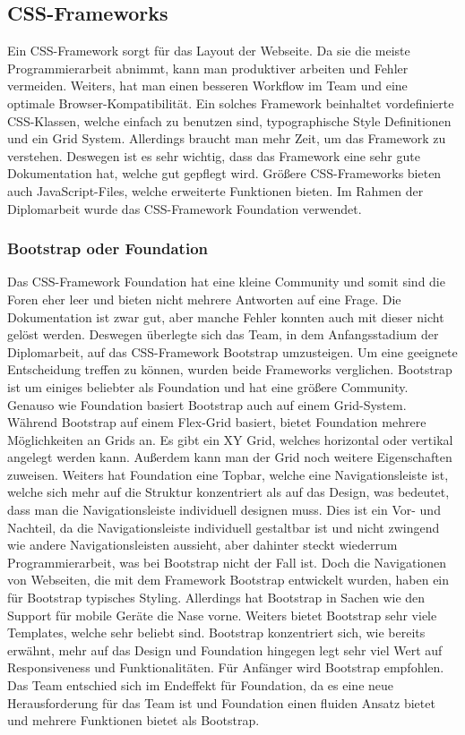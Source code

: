 \subsection{CSS-Frameworks} 
Ein CSS-Framework sorgt für das Layout der Webseite. Da sie die meiste Programmierarbeit abnimmt, kann man produktiver arbeiten und Fehler vermeiden. Weiters, hat man einen besseren Workflow im Team und eine optimale Browser-Kompatibilität. 
Ein solches Framework beinhaltet vordefinierte CSS-Klassen, welche einfach zu benutzen sind, typographische Style Definitionen und ein Grid System.  
Allerdings braucht man mehr Zeit, um das Framework zu verstehen. Deswegen ist es sehr wichtig, dass das Framework eine sehr gute Dokumentation hat, welche gut gepflegt wird. Größere CSS-Frameworks bieten auch JavaScript-Files, welche erweiterte Funktionen bieten. Im Rahmen der Diplomarbeit wurde das CSS-Framework Foundation verwendet.\cite{cssframework}
\subsubsection{Bootstrap oder Foundation}
Das CSS-Framework Foundation hat eine kleine Community und somit sind die Foren eher leer und bieten nicht mehrere Antworten auf eine Frage. Die Dokumentation ist zwar gut, aber manche Fehler konnten auch mit dieser nicht gelöst werden. Deswegen überlegte sich das Team, in dem Anfangsstadium der Diplomarbeit, auf das CSS-Framework Bootstrap umzusteigen. Um eine geeignete Entscheidung treffen zu können, wurden beide Frameworks verglichen. Bootstrap ist um einiges beliebter als Foundation und hat eine größere Community. Genauso wie Foundation basiert Bootstrap auch auf einem Grid-System. Während Bootstrap auf einem Flex-Grid basiert, bietet Foundation mehrere Möglichkeiten an Grids an. Es gibt ein XY Grid, welches horizontal oder vertikal angelegt werden kann. Außerdem kann man der Grid noch weitere Eigenschaften zuweisen. \cite{bootstrapfoundation} Weiters hat Foundation eine Topbar, welche eine Navigationsleiste ist, welche sich mehr auf die Struktur konzentriert als auf das Design, was bedeutet, dass man die Navigationsleiste individuell designen muss. Dies ist ein Vor- und Nachteil, da die Navigationsleiste individuell gestaltbar ist und nicht zwingend wie andere Navigationsleisten aussieht, aber dahinter steckt wiederrum Programmierarbeit, was bei Bootstrap nicht der Fall ist. Doch die Navigationen von Webseiten, die mit dem Framework Bootstrap entwickelt wurden, haben ein für Bootstrap typisches Styling. \cite{bootstrapfoundation2} Allerdings hat Bootstrap in Sachen wie den Support für mobile Geräte die Nase vorne. Weiters bietet Bootstrap sehr viele Templates, welche sehr beliebt sind. Bootstrap konzentriert sich, wie bereits erwähnt, mehr auf das Design und Foundation hingegen legt sehr viel Wert auf Responsiveness und Funktionalitäten. Für Anfänger wird Bootstrap empfohlen. Das Team entschied sich im Endeffekt für Foundation, da es eine neue Herausforderung für das Team ist und Foundation einen fluiden Ansatz bietet und mehrere Funktionen bietet als Bootstrap. \cite{bootstrapfoundation3}
